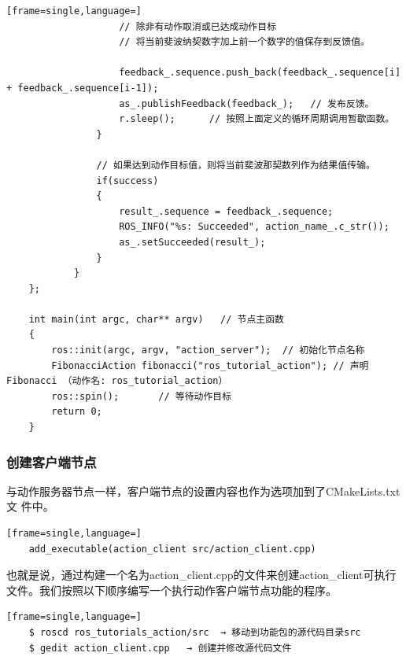 \documentclass[geye,green,kindle,cn]{elegantnote}
\begin{document}
\begin{lstlisting}[frame=single,language=]
                    // 除非有动作取消或已达成动作目标      
                    // 将当前斐波纳契数字加上前一个数字的值保存到反馈值。      
                
                    feedback_.sequence.push_back(feedback_.sequence[i] + feedback_.sequence[i-1]);  
                    as_.publishFeedback(feedback_);   // 发布反馈。      
                    r.sleep();      // 按照上面定义的循环周期调用暂歇函数。    
                }    
                
                // 如果达到动作目标值，则将当前斐波那契数列作为结果值传输。    
                if(success)    
                { 
                    result_.sequence = feedback_.sequence;      
                    ROS_INFO("%s: Succeeded", action_name_.c_str());      
                    as_.setSucceeded(result_);    
                }  
            }
    }; 
    
    int main(int argc, char** argv)   // 节点主函数 
    {  
        ros::init(argc, argv, "action_server");  // 初始化节点名称  
        FibonacciAction fibonacci("ros_tutorial_action"); // 声明Fibonacci （动作名: ros_tutorial_action）   
        ros::spin();       // 等待动作目标  
        return 0; 
    }
\end{lstlisting}
\subsubsection{创建客户端节点}
与动作服务器节点一样，客户端节点的设置内容也作为选项加到了CMakeLists.txt文 件中。 
\begin{lstlisting}[frame=single,language=]
    add_executable(action_client src/action_client.cpp) 
\end{lstlisting}

也就是说，通过构建一个名为action_client.cpp的文件来创建action_client可执行文件。我们按照以下顺序编写一个执行动作客户端节点功能的程序。
\begin{lstlisting}[frame=single,language=]
    $ roscd ros_tutorials_action/src  → 移动到功能包的源代码目录src 
    $ gedit action_client.cpp   → 创建并修改源代码文件
\end{lstlisting}
\end{document}
